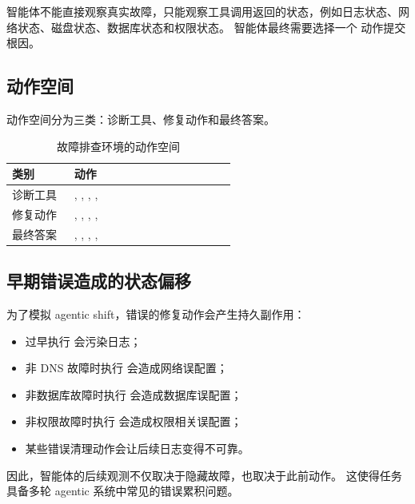 \documentclass[11pt]{ctexart}
\begin{document}
智能体不能直接观察真实故障，只能观察工具调用返回的状态，例如日志状态、网络状态、磁盘状态、数据库状态和权限状态。
智能体最终需要选择一个  动作提交根因。

\subsection{动作空间}

动作空间分为三类：诊断工具、修复动作和最终答案。

\begin{table}[H]
\centering
\caption{故障排查环境的动作空间}
\begin{tabular}{L{0.25\linewidth} L{0.65\linewidth}}
\toprule
类别 & 动作 \\
\midrule
诊断工具
&
,
,
,
,
\\
修复动作
&
,
,
,
,
\\
最终答案
&
,
,
,
,
\\
\bottomrule
\end{tabular}
\end{table}

\subsection{早期错误造成的状态偏移}

为了模拟 agentic shift，错误的修复动作会产生持久副作用：

\begin{itemize}
    \item 过早执行  会污染日志；
    \item 非 DNS 故障时执行  会造成网络误配置；
    \item 非数据库故障时执行  会造成数据库误配置；
    \item 非权限故障时执行  会造成权限相关误配置；
    \item 某些错误清理动作会让后续日志变得不可靠。
\end{itemize}

因此，智能体的后续观测不仅取决于隐藏故障，也取决于此前动作。
这使得任务具备多轮 agentic 系统中常见的错误累积问题。
\end{document}
